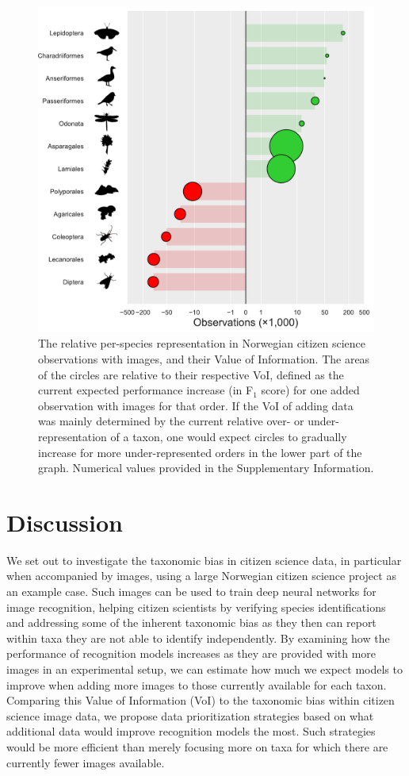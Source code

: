 \documentclass{article}
\begin{document}
\begin{figure}[!ht]
  \includegraphics[width=\textwidth]{4}
  \caption{\footnotesize The relative per-species representation in Norwegian citizen science observations with images, and their Value of Information. The areas of the circles are relative to their respective VoI, defined as the current expected performance increase (in F\(_1\) score) for one added observation with images for that order. If the VoI of adding data was mainly determined by the current relative over- or under-representation of a taxon, one would expect circles to gradually increase for more under-represented orders in the lower part of the graph. Numerical values provided in the Supplementary Information.}
  \label{fig:VoI_vs_bias}
\end{figure}

\section*{Discussion}
We set out to investigate the taxonomic bias in citizen science data, in particular when accompanied by images, using a large Norwegian citizen science project as an example case. Such images can be used to train deep neural networks for image recognition, helping citizen scientists by verifying species identifications and addressing some of the inherent taxonomic bias as they then can report within taxa they are not able to identify independently. By examining how the performance of recognition models increases as they are provided with more images in an experimental setup, we can estimate how much we expect models to improve when adding more images to those currently available for each taxon. Comparing this Value of Information (VoI) to the taxonomic bias within citizen science image data, we propose data prioritization strategies based on what additional data would improve recognition models the most. Such strategies would be more efficient than merely focusing more on taxa for which there are currently fewer images available.
\end{document}
